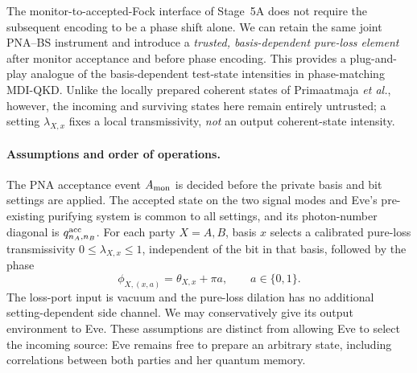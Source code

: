 \documentclass[11pt]{article}
\theoremstyle{remark}
\begin{document}
The monitor-to-accepted-Fock interface of Stage~5A does not require the
subsequent encoding to be a phase shift alone.  We can retain the same
joint PNA--BS instrument and introduce a \emph{trusted,
basis-dependent pure-loss element} after monitor acceptance and before
phase encoding.  This provides a plug-and-play analogue of the
basis-dependent test-state intensities in phase-matching MDI-QKD.
Unlike the locally prepared coherent states of
Primaatmaja \emph{et al.}, however, the incoming and surviving states here
remain entirely untrusted; a setting \(\lambda_{X,x}\) fixes a local
transmissivity, \emph{not} an output coherent-state intensity.

\paragraph{Assumptions and order of operations.}
The PNA acceptance event \(A_{\rm mon}\) is decided before the private
basis and bit settings are applied.  The accepted state on the two
signal modes and Eve's pre-existing purifying system is common to all
settings, and its photon-number diagonal is
\(q_{n_A,n_B}^{\rm acc}\).  For each party \(X=A,B\), basis \(x\) selects
a calibrated pure-loss transmissivity
\(0\le\lambda_{X,x}\le1\), independent of the bit in that basis,
followed by the phase
\[
  \phi_{X,(x,a)}=\theta_{X,x}+\pi a,\qquad a\in\{0,1\}.
\]
The loss-port input is vacuum and the pure-loss dilation has no
additional setting-dependent side channel.  We may conservatively give
its output environment to Eve.  These assumptions are distinct from
allowing Eve to select the incoming source: Eve remains free to
prepare an arbitrary state, including correlations between both
parties and her quantum memory.
\end{document}
